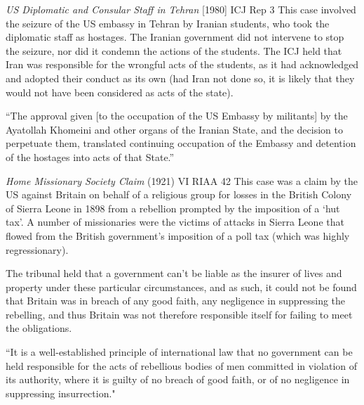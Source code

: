 \begin{casedetails}{\textit{US Diplomatic and Consular Staff in Tehran} [1980] ICJ Rep 3}
    \flushleft
    This case involved the seizure of the US embassy in Tehran by Iranian students, who took the diplomatic staff as hostages. The Iranian government did not intervene to stop the seizure, nor did it condemn the actions of the students. The ICJ held that Iran was responsible for the wrongful acts of the students, as it had acknowledged and adopted their conduct as its own (had Iran not done so, it is likely that they would not have been considered as acts of the state).
    
    \vspace{\baselineskip}

    ``The approval given [to the occupation of the US Embassy by militants] by the Ayatollah Khomeini and other organs of the Iranian State, and the decision to perpetuate them, translated continuing occupation of the Embassy and detention of the hostages into acts of that State.''
\end{casedetails}

\begin{casedetails}{\textit{Home Missionary Society Claim} (1921) VI RIAA 42}
    \flushleft
    This case was a claim by the US against Britain on behalf of a religious group for losses in the British Colony of Sierra Leone in 1898 from a rebellion prompted by the imposition of a `hut tax'. A number of missionaries were the victims of attacks in Sierra Leone that flowed from the British government's imposition of a poll tax (which was highly regressionary).

    \vspace{\baselineskip}

    The tribunal held that a government can't be liable as the insurer of lives and property under these particular circumstances, and as such, it could not be found that Britain was in breach of any good faith, any negligence in suppressing the rebelling, and thus Britain was not therefore responsible itself for failing to meet the obligations.

    \vspace{\baselineskip}

    ``It is a well-established principle of international law that no government can be held responsible for the acts of rebellious bodies of men committed in violation of its authority, where it is guilty of no breach of good faith, or of no negligence in suppressing insurrection."

\end{casedetails}

